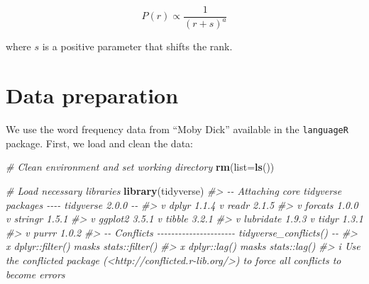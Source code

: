 \documentclass[
]{book}
\newenvironment{Shaded}{\begin{snugshade}}{\end{snugshade}}
\newcommand{\AttributeTok}[1]{\textcolor[rgb]{0.13,0.29,0.53}{#1}}
\newcommand{\CommentTok}[1]{\textcolor[rgb]{0.56,0.35,0.01}{\textit{#1}}}
\newcommand{\FunctionTok}[1]{\textcolor[rgb]{0.13,0.29,0.53}{\textbf{#1}}}
\newcommand{\NormalTok}[1]{#1}
\begin{document}
\[ P(r) \propto \frac{1}{(r+s)^a} \]

where \(s\) is a positive parameter that shifts the rank.

\section{Data preparation}\label{data-preparation}

We use the word frequency data from ``Moby Dick'' available in the \texttt{languageR} package. First, we load and clean the data:

\begin{Shaded}
\begin{Highlighting}[]
\CommentTok{\# Clean environment and set working directory}
\FunctionTok{rm}\NormalTok{(}\AttributeTok{list=}\FunctionTok{ls}\NormalTok{())}

\CommentTok{\# Load necessary libraries}
\FunctionTok{library}\NormalTok{(tidyverse)}
\CommentTok{\#\textgreater{} {-}{-} Attaching core tidyverse packages {-}{-}{-}{-} tidyverse 2.0.0 {-}{-}}
\CommentTok{\#\textgreater{} v dplyr     1.1.4     v readr     2.1.5}
\CommentTok{\#\textgreater{} v forcats   1.0.0     v stringr   1.5.1}
\CommentTok{\#\textgreater{} v ggplot2   3.5.1     v tibble    3.2.1}
\CommentTok{\#\textgreater{} v lubridate 1.9.3     v tidyr     1.3.1}
\CommentTok{\#\textgreater{} v purrr     1.0.2     }
\CommentTok{\#\textgreater{} {-}{-} Conflicts {-}{-}{-}{-}{-}{-}{-}{-}{-}{-}{-}{-}{-}{-}{-}{-}{-}{-}{-}{-}{-}{-} tidyverse\_conflicts() {-}{-}}
\CommentTok{\#\textgreater{} x dplyr::filter() masks stats::filter()}
\CommentTok{\#\textgreater{} x dplyr::lag()    masks stats::lag()}
\CommentTok{\#\textgreater{} i Use the conflicted package (\textless{}http://conflicted.r{-}lib.org/\textgreater{}) to force all conflicts to become errors}
\end{Highlighting}
\end{Shaded}
\end{document}

